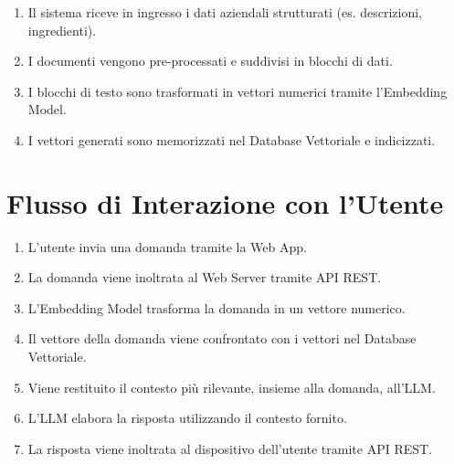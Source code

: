 \begin{enumerate}
    \item Il sistema riceve in ingresso i dati aziendali strutturati (es. descrizioni, ingredienti).
    \item I documenti vengono pre-processati e suddivisi in blocchi di dati.
    \item I blocchi di testo sono trasformati in vettori numerici tramite l'Embedding Model.
    \item I vettori generati sono memorizzati nel Database Vettoriale e indicizzati.
\end{enumerate}

\section*{Flusso di Interazione con l'Utente}

\begin{enumerate}
    \item L'utente invia una domanda tramite la Web App.
    \item La domanda viene inoltrata al Web Server tramite API REST.
    \item L'Embedding Model trasforma la domanda in un vettore numerico.
    \item Il vettore della domanda viene confrontato con i vettori nel Database Vettoriale.
    \item Viene restituito il contesto più rilevante, insieme alla domanda, all'LLM.
    \item L'LLM elabora la risposta utilizzando il contesto fornito.
    \item La risposta viene inoltrata al dispositivo dell'utente tramite API REST.
\end{enumerate}

